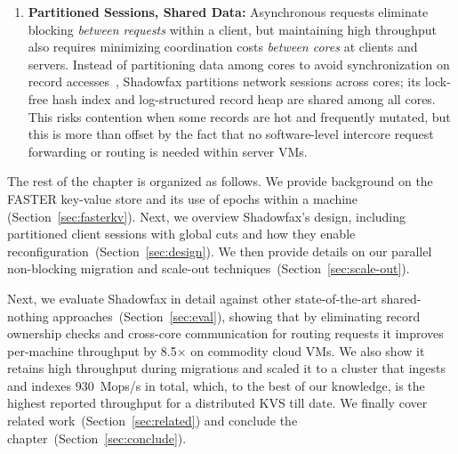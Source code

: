 \begin{enumerate}
\item {\bf Partitioned Sessions, Shared Data:}
Asynchronous requests eliminate blocking {\em between requests} within a client, but
maintaining high throughput also requires minimizing coordination
costs {\em between cores} at clients and servers.
%
Instead of partitioning data among cores to avoid synchronization on record
accesses~\cite{hstore,voltdb,mica,seastar}, Shadowfax partitions network
sessions across cores; its lock-free hash index and log-structured record heap
are shared among all cores.
%
This risks contention when some records are hot and frequently
mutated, but this is more than offset by the fact that no software-level
intercore request forwarding or routing is needed within server VMs.

\end{enumerate}

The rest of the chapter is organized as follows. We provide background on the FASTER
key-value store and its use of epochs within a machine (Section~\ref{sec:fasterkv}). Next,
we overview Shadowfax's design, including partitioned client
sessions with global cuts and how they enable
reconfiguration~(Section~\ref{sec:design}). We then provide details on our parallel
non-blocking migration and scale-out techniques~(Section~\ref{sec:scale-out}).
%
\iffalse
In the remainder of this paper, we describe how the key synchronization
mechanisms at the core of \faster{}'s design (Section~\ref{sec:epochs}) naturally led
to Shadowfax's sessions that extend global cuts over the network
(\S\ref{sec:sessions}). We describe how this enables Shadowfax to perform the
same over the network as with a local \faster{}
instance~(\S\ref{sec:eval:clients}), and we describe how they enable
reconfiguration~(\S\ref{sec:ownership}) and parallel data
migration~(\S\ref{sec:scale-out}). We also describe how Shadowfax does this
while supporting larger-than-memory datasets that span SSD and cloud blob
storage.
\fi
%
Next, we evaluate Shadowfax in detail against other state-of-the-art shared-nothing
approaches~(Section~\ref{sec:eval}), showing that by eliminating record ownership
checks and cross-core communication for routing requests it improves
per-machine throughput by 8.5$\times$ on commodity cloud VMs.
%
We also show it retains high throughput during migrations and scaled it
to a
cluster that ingests and indexes 930~Mops/s in total,
%
which, to the best of our knowledge, is the highest
reported throughput for a distributed KVS till date. We finally cover
related work~(Section~\ref{sec:related}) and conclude the
chapter~(Section~\ref{sec:conclude}).
